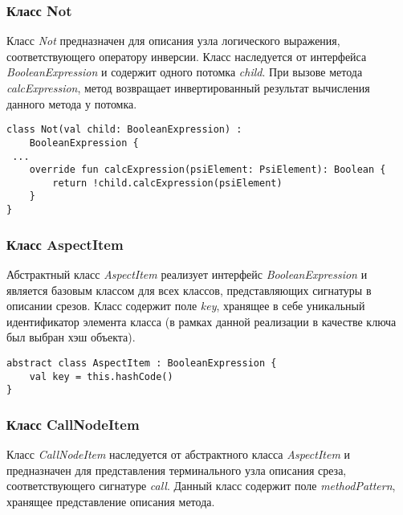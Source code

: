 \subsubsection{Класс Not}
\label{ssub:Not}
Класс \textit{Not} предназначен для описания узла логического выражения,
соответствующего оператору инверсии.
Класс наследуется от интерфейса \textit{BooleanExpression} и содержит одного
потомка \textit{child}.
При вызове метода \textit{calcExpression}, метод возвращает инвертированный
результат вычисления данного метода у потомка.

\begin{lstlisting}[style={java}, label={lst:Not},
  caption={Класс Not}]
class Not(val child: BooleanExpression) :
	BooleanExpression {
 ...
    override fun calcExpression(psiElement: PsiElement): Boolean {
        return !child.calcExpression(psiElement)
    }
}
\end{lstlisting}
\subsubsection{Класс AspectItem}
\label{ssub:AspectItem}
Абстрактный класс \textit{AspectItem} реализует интерфейс
\textit{BooleanExpression} и является базовым классом для всех классов,
представляющих сигнатуры в описании срезов.
Класс содержит поле \textit{key}, хранящее в себе уникальный идентификатор
элемента класса (в рамках данной реализации в качестве ключа был выбран хэш
объекта).

\begin{lstlisting}[style={java}, label={lst:AspectItem},
  caption={Класс AspectItem}]
abstract class AspectItem : BooleanExpression {
    val key = this.hashCode()
}
\end{lstlisting}
\subsubsection{Класс CallNodeItem}
\label{ssub:CallNodeItem}
Класс \textit{CallNodeItem} наследуется от абстрактного класса
\textit{AspectItem} и предназначен для представления терминального узла
описания среза, соответствующего сигнатуре \textit{call}.
Данный класс содержит поле \textit{methodPattern}, хранящее представление
описания метода.

